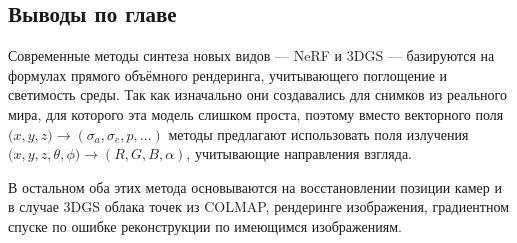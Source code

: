 \subsection{Выводы по главе}

Современные методы синтеза новых видов --- NeRF и 3DGS --- базируются на формулах прямого объёмного рендеринга, учитывающего поглощение и светимость среды. Так как изначально они создавались для снимков из реального мира, для которого эта модель слишком проста, поэтому вместо векторного поля $\mathcal (x, y, z) \to (\sigma_a, \sigma_e, p, \dots)$ методы предлагают использовать поля излучения $\mathcal (x, y, z, \theta, \phi) \to (R, G, B, \alpha)$, учитывающие направления взгляда.

В остальном оба этих метода основываются на восстановлении позиции камер и в случае 3DGS облака точек из COLMAP, рендеринге изображения, градиентном спуске по ошибке реконструкции по имеющимся изображениям. 